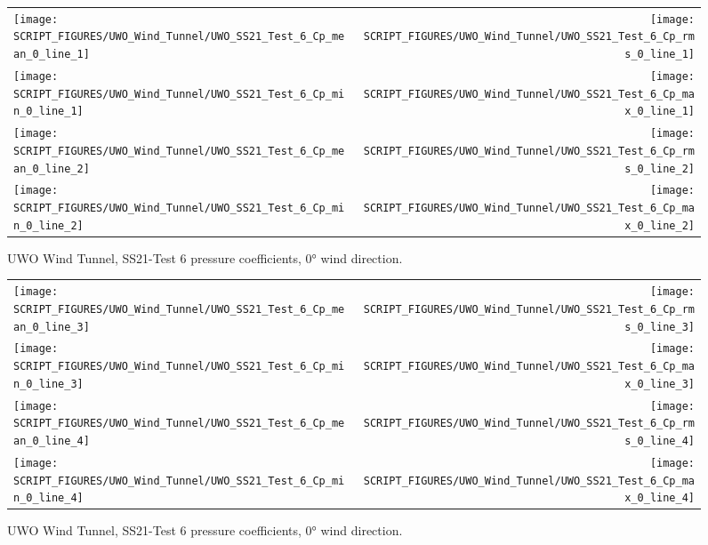 \begin{figure}[p]
\begin{tabular*}{\textwidth}{l@{\extracolsep{\fill}}r}
\texttt{[image: SCRIPT\_FIGURES/UWO\_Wind\_Tunnel/UWO\_SS21\_Test\_6\_Cp\_mean\_0\_line\_1]} &
\texttt{[image: SCRIPT\_FIGURES/UWO\_Wind\_Tunnel/UWO\_SS21\_Test\_6\_Cp\_rms\_0\_line\_1]} \\
\texttt{[image: SCRIPT\_FIGURES/UWO\_Wind\_Tunnel/UWO\_SS21\_Test\_6\_Cp\_min\_0\_line\_1]} &
\texttt{[image: SCRIPT\_FIGURES/UWO\_Wind\_Tunnel/UWO\_SS21\_Test\_6\_Cp\_max\_0\_line\_1]} \\
\texttt{[image: SCRIPT\_FIGURES/UWO\_Wind\_Tunnel/UWO\_SS21\_Test\_6\_Cp\_mean\_0\_line\_2]} &
\texttt{[image: SCRIPT\_FIGURES/UWO\_Wind\_Tunnel/UWO\_SS21\_Test\_6\_Cp\_rms\_0\_line\_2]} \\
\texttt{[image: SCRIPT\_FIGURES/UWO\_Wind\_Tunnel/UWO\_SS21\_Test\_6\_Cp\_min\_0\_line\_2]} &
\texttt{[image: SCRIPT\_FIGURES/UWO\_Wind\_Tunnel/UWO\_SS21\_Test\_6\_Cp\_max\_0\_line\_2]}
\end{tabular*}
\caption[UWO Wind Tunnel, SS21-Test 6 pressure coefficients, 0\si{\degree}]{UWO Wind Tunnel, SS21-Test 6 pressure coefficients, 0\si{\degree} wind direction.}
\label{UWO_SS21_Test_6_pressure_coefficients_0_1}
\end{figure}

\begin{figure}[p]
\begin{tabular*}{\textwidth}{l@{\extracolsep{\fill}}r}
\texttt{[image: SCRIPT\_FIGURES/UWO\_Wind\_Tunnel/UWO\_SS21\_Test\_6\_Cp\_mean\_0\_line\_3]} &
\texttt{[image: SCRIPT\_FIGURES/UWO\_Wind\_Tunnel/UWO\_SS21\_Test\_6\_Cp\_rms\_0\_line\_3]} \\
\texttt{[image: SCRIPT\_FIGURES/UWO\_Wind\_Tunnel/UWO\_SS21\_Test\_6\_Cp\_min\_0\_line\_3]} &
\texttt{[image: SCRIPT\_FIGURES/UWO\_Wind\_Tunnel/UWO\_SS21\_Test\_6\_Cp\_max\_0\_line\_3]} \\
\texttt{[image: SCRIPT\_FIGURES/UWO\_Wind\_Tunnel/UWO\_SS21\_Test\_6\_Cp\_mean\_0\_line\_4]} &
\texttt{[image: SCRIPT\_FIGURES/UWO\_Wind\_Tunnel/UWO\_SS21\_Test\_6\_Cp\_rms\_0\_line\_4]} \\
\texttt{[image: SCRIPT\_FIGURES/UWO\_Wind\_Tunnel/UWO\_SS21\_Test\_6\_Cp\_min\_0\_line\_4]} &
\texttt{[image: SCRIPT\_FIGURES/UWO\_Wind\_Tunnel/UWO\_SS21\_Test\_6\_Cp\_max\_0\_line\_4]}
\end{tabular*}
\caption[UWO Wind Tunnel, SS21-Test 6 pressure coefficients, 0\si{\degree}]{UWO Wind Tunnel, SS21-Test 6 pressure coefficients, 0\si{\degree} wind direction.}
\label{UWO_SS21_Test_6_pressure_coefficients_0_2}
\end{figure}

